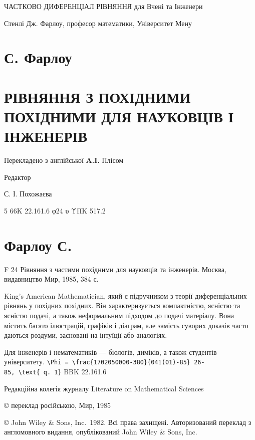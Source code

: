 \documentclass[
  ukrainian,
]{article}
\author{}
\date{}
\begin{document}
ЧАСТКОВО ДИФЕРЕНЦІАЛ РІВНЯННЯ для Вчені та Інженери

Стенлі Дж. Фарлоу, професор математики, Університет Мену

\section{С. Фарлоу}\label{ux441.-ux444ux430ux440ux43bux43eux443}

\section{РІВНЯННЯ З ПОХІДНИМИ ПОХІДНИМИ ДЛЯ НАУКОВЦІВ І
ІНЖЕНЕРІВ}\label{ux440ux456ux432ux43dux44fux43dux43dux44f-ux437-ux43fux43eux445ux456ux434ux43dux438ux43cux438-ux43fux43eux445ux456ux434ux43dux438ux43cux438-ux434ux43bux44f-ux43dux430ux443ux43aux43eux432ux446ux456ux432-ux456-ux456ux43dux436ux435ux43dux435ux440ux456ux432}

Перекладено з англійської \textbf{A.I.} Плісом

Редактор

С. І. Похожаєва

5\textbar{} 66K 22.161.6 φ24 υ ΥΠΚ 517.2

\section{Фарлоу С.}\label{ux444ux430ux440ux43bux43eux443-ux441.}

F 24 Рівняння з частими похідними для науковців та інженерів. Москва,
видавництво Мир, 1985, 384 с.

King's American Mathematician, який є підручником з теорії
диференціальних рівнянь у похідних похідних. Він характеризується
компактністю, ясністю та ясністю подачі, а також неформальним підходом
до подачі матеріалу. Вона містить багато ілюстрацій, графіків і діаграм,
але замість суворих доказів часто даються роздуми, засновані на інтуїції
або аналогіях.

Для інженерів і нематематиків --- біологів, диміків, а також студентів
університету.
\texttt{\textbackslash{}Phi\ =\ \textbackslash{}frac\{1702050000-380\}\{041(01)-85\}\ 26-85,\ \textbackslash{}text\{\ q.\ 1\}}
BBK 22.161.6

Редакційна колегія журналу Literature on Mathematical Sciences

© переклад російською, Мир, 1985

© John Wiley \& Sons, Inc.~1982. Всі права захищені. Авторизований
переклад з англомовного видання, опублікований John Wiley \& Sons, Inc.
\end{document}
